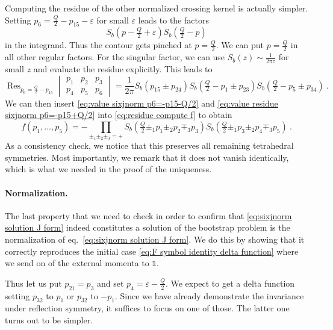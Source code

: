 \documentclass[12pt,a4paper]{article}
\newcommand{\be}{\begin{equation}}
\newcommand{\ee}{\end{equation}}
\newcommand\id{\mathds{1}}
\DeclareMathOperator*{\Res}{Res}
\newcommand{\sixjnorm}[6]{\begin{vmatrix}
#1 & #2 & #3 \\
#4 & #5 & #6
\end{vmatrix}
}
\begin{document}
Computing the residue of the other normalized crossing kernel is actually simpler. Setting $p_6=\frac{Q}{2}-p_{15}-\varepsilon$ for small $\varepsilon$ leads to the factors
\be 
S_b(p-\tfrac{Q}{2}+\varepsilon)S_b(\tfrac{Q}{2}-p)
\ee
in the integrand. Thus the contour gets pinched at $p=\frac{Q}{2}$. We can put $p=\frac{Q}{2}$ in all other regular factors. For the singular factor, we can use $S_b(z) \sim \frac{1}{2\pi z}$ for small $z$ and evaluate the residue explicitly. This leads to
\be 
\Res_{p_6=\frac{Q}{2}-p_{15}} \sixjnorm{p_1}{p_2}{p_3}{p_4}{p_5}{p_6}=\frac{1}{2\pi} S_b(p_{15} \pm p_{24}) S_b(\tfrac{Q}{2}-p_1 \pm p_{23}) S_b(\tfrac{Q}{2}-p_5 \pm p_{34})\ .  \label{eq:value residue sixjnorm p6=-p15+Q/2}
\ee
We can then insert \eqref{eq:value sixjnorm p6=-p15-Q/2} and \eqref{eq:value residue sixjnorm p6=-p15+Q/2} into \eqref{eq:residue compute f} to obtain
\be 
f(p_1,\dots,p_5)=-\prod_{\pm_1 \pm_2 \pm_3=+} S_b(\tfrac{Q}{2} \pm_1 p_1 \pm_2 p_2 \mp_3 p_3) S_b(\tfrac{Q}{2} \pm_1 p_3 \pm_2 p_4 \mp_3 p_5)\ .
\ee
As a consistency check, we notice that this preserves all remaining tetrahedral symmetries. Most importantly, we remark that it does not vanish identically, which is what we needed in the proof of the uniqueness.

\paragraph{Normalization.} The last property that we need to check in order to confirm that \eqref{eq:sixjnorm solution J form} indeed constitutes a solution of the bootstrap problem is the normalization of eq.~\eqref{eq:sixjnorm solution J form}. We do this by showing that it correctly reproduces the initial case \eqref{eq:F symbol identity delta function} where we send on of the external momenta to $\id$.

Thus let us put $p_{21}=p_3$ and set $p_4=\varepsilon-\frac{Q}{2}$. We expect to get a delta function setting $p_{32}$ to $p_1$ or $p_{32}$ to $-p_1$. Since we have already demonstrate the invariance under reflection symmetry, it suffices to focus on one of those. The latter one turns out to be simpler.
\end{document}
